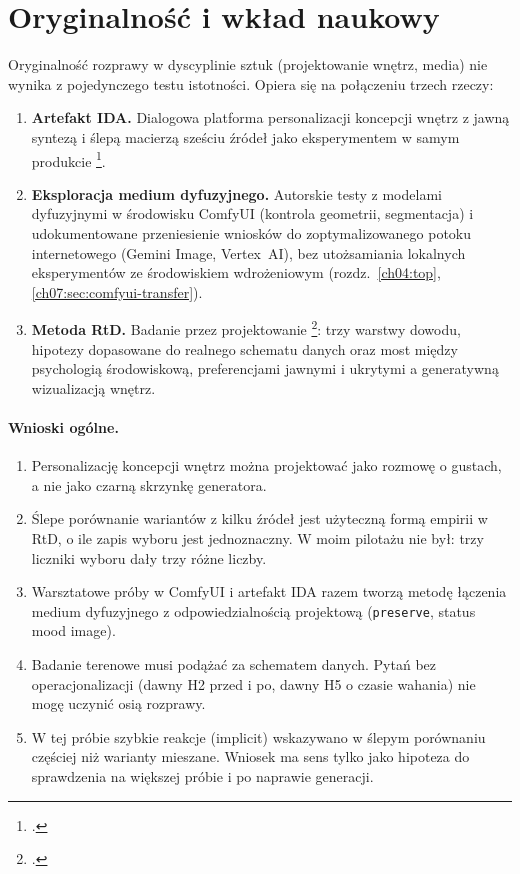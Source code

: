 \section{Oryginalność i wkład naukowy}
\label{ch10:sec:wklad}

Oryginalność rozprawy w dyscyplinie sztuk (projektowanie wnętrz, media) nie wynika z pojedynczego testu istotności. Opiera się na połączeniu trzech rzeczy:

\begin{enumerate}
  \item \textbf{Artefakt IDA.} Dialogowa platforma personalizacji koncepcji wnętrz z jawną syntezą i ślepą macierzą sześciu źródeł jako eksperymentem w samym produkcie \footcite{idaPlatform2026,zimmerman2007rtd}.
  \item \textbf{Eksploracja medium dyfuzyjnego.} Autorskie testy z modelami dyfuzyjnymi w środowisku ComfyUI (kontrola geometrii, segmentacja) i udokumentowane przeniesienie wniosków do zoptymalizowanego potoku internetowego (Gemini Image, Vertex~AI), bez utożsamiania lokalnych eksperymentów ze środowiskiem wdrożeniowym (rozdz.~\ref{ch04:top}, \ref{ch07:sec:comfyui-transfer}).
  \item \textbf{Metoda RtD.} Badanie przez projektowanie \footcite{frayling1993research}: trzy warstwy dowodu, hipotezy dopasowane do realnego schematu danych oraz most między psychologią środowiskową, preferencjami jawnymi i ukrytymi a generatywną wizualizacją wnętrz.
\end{enumerate}

\paragraph{Wnioski ogólne.}
\begin{enumerate}
  \item Personalizację koncepcji wnętrz można projektować jako rozmowę o gustach, a nie jako czarną skrzynkę generatora.
  \item Ślepe porównanie wariantów z kilku źródeł jest użyteczną formą empirii w RtD, o ile zapis wyboru jest jednoznaczny. W moim pilotażu nie był: trzy liczniki wyboru dały trzy różne liczby.
  \item Warsztatowe próby w ComfyUI i artefakt IDA razem tworzą metodę łączenia medium dyfuzyjnego z odpowiedzialnością projektową (\texttt{preserve}, status mood image).
  \item Badanie terenowe musi podążać za schematem danych. Pytań bez operacjonalizacji (dawny H2 przed i po, dawny H5 o czasie wahania) nie mogę uczynić osią rozprawy.
  \item W tej próbie szybkie reakcje (implicit) wskazywano w ślepym porównaniu częściej niż warianty mieszane. Wniosek ma sens tylko jako hipoteza do sprawdzenia na większej próbie i po naprawie generacji.
\end{enumerate}

